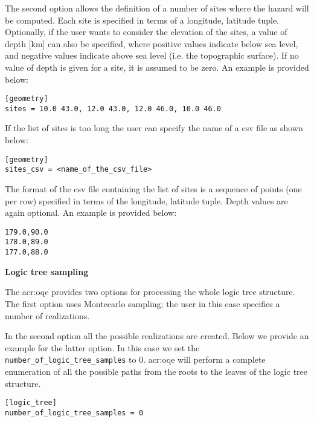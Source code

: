 The second option allows the definition of a number of sites where the hazard
will be computed. Each site is specified in terms of a longitude, latitude tuple.
Optionally, if the user wants to consider the elevation of the sites, a value of
depth [km] can also be specified, where positive values indicate below sea level,
and negative values indicate above sea level (i.e. the topographic surface). If
no value of depth is given for a site, it is assumed to be zero. An example is
provided below:

\begin{verbatim}
[geometry]
sites = 10.0 43.0, 12.0 43.0, 12.0 46.0, 10.0 46.0
\end{verbatim}

If the list of sites is too long the user can specify the name of a csv file
as shown below:

\begin{verbatim}
[geometry]
sites_csv = <name_of_the_csv_file>
\end{verbatim}

The format of the csv file containing the list of sites is a sequence of
points (one per row) specified in terms of the longitude, latitude tuple. Depth
values are again optional. An example is provided below:

\begin{verbatim}
179.0,90.0
178.0,89.0
177.0,88.0
\end{verbatim}

\textbf{Logic tree sampling}

The \gls{acr:oqe} provides two options for processing the whole logic tree
structure. The first option uses Montecarlo sampling; the user in this case
specifies a number of realizations.

In the second option all the possible realizations are created. Below we
provide an example for the latter option. In this case we set the
\texttt{number\-\_of\-\_logic\_tree\_samples} to 0. \gls{acr:oqe} will perform
a complete enumeration of all  the possible paths from the roots to the leaves
of the logic tree  structure.

\begin{verbatim}
[logic_tree]
number_of_logic_tree_samples = 0
\end{verbatim}

